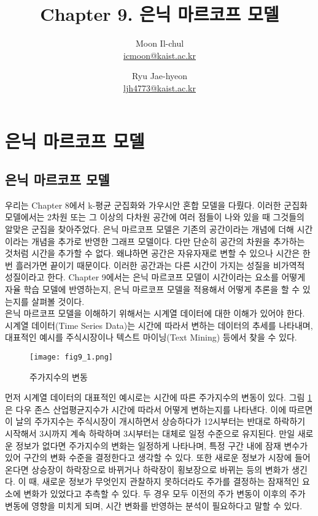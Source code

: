 \documentclass[a4paper]{oblivoir}
\author{Moon Il-chul \\ \href{mailto:icmoon@kaist.ac.kr}{icmoon@kaist.ac.kr} 
   \and Ryu Jae-hyeon
 \\ \href{mailto:ljh4773@kaist.ac.kr}{ljh4773@kaist.ac.kr} }
\title{Chapter 9. 은닉 마르코프 모델}
\begin{document}
\maketitle
\tableofcontents

\section{은닉 마르코프 모델}

\subsection{은닉 마르코프 모델}

우리는 Chapter 8에서 k-평균 군집화와 가우시안 혼합 모델을 다뤘다. 이러한 군집화 모델에서는 2차원 또는 그 이상의 다차원 공간에 여러 점들이 나와 있을 때 그것들의 알맞은 군집을 찾아주었다. 은닉 마르코프 모델은 기존의 공간이라는 개념에 더해 시간이라는 개념을 추가로 반영한 그래프 모델이다. 다만 단순히 공간의 차원을 추가하는 것처럼 시간을 추가할 수 없다. 왜냐하면 공간은 자유자재로 변할 수 있으나 시간은 한 번 흘러가면 끝이기 때문이다. 이러한 공간과는 다른 시간이 가지는 성질을 비가역적 성질이라고 한다. Chapter 9에서는 은닉 마르코프 모델이 시간이라는 요소를 어떻게 자율 학습 모델에 반영하는지, 은닉 마르코프 모델을 적용해서 어떻게 추론을 할 수 있는지를 살펴볼 것이다. \\

은닉 마르코프 모델을 이해하기 위해서는 시계열 데이터에 대한 이해가 있어야 한다. 시계열 데이터(Time Series Data)는 시간에 따라서 변하는 데이터의 추세를 나타내며, 대표적인 예시를 주식시장이나 텍스트 마이닝(Text Mining) 등에서 찾을 수 있다. \\

\begin{figure}[ht] \centering 
\texttt{[image: fig9\_1.png]} 
\caption{주가지수의 변동}
\label{fig:9-1}
\end{figure}

먼저 시계열 데이터의 대표적인 예시로는 시간에 따른 주가지수의 변동이 있다. 그림 \ref{fig:9-1}은 다우 존스 산업평균지수가 시간에 따라서 어떻게 변하는지를 나타낸다. 이에 따르면 이 날의 주가지수는 주식시장이 개시하면서 상승하다가 12시부터는 반대로 하락하기 시작해서 3시까지 계속 하락하며 3시부터는 대체로 일정 수준으로 유지된다. 만일 새로운 정보가 없다면 주가지수의 변화는 일정하게 나타나며, 특정 구간 내에 잠재 변수가 있어 구간의 변화 수준을 결정한다고 생각할 수 있다. 또한 새로운 정보가 시장에 들어온다면 상승장이 하락장으로 바뀌거나 하락장이 횡보장으로 바뀌는 등의 변화가 생긴다. 이 때, 새로운 정보가 무엇인지 관찰하지 못하더라도 주가를 결정하는 잠재적인 요소에 변화가 있었다고 추측할 수 있다. 두 경우 모두 이전의 주가 변동이 이후의 주가 변동에 영향을 미치게 되며, 시간 변화를 반영하는 분석이 필요하다고 말할 수 있다. \\
\end{document}
